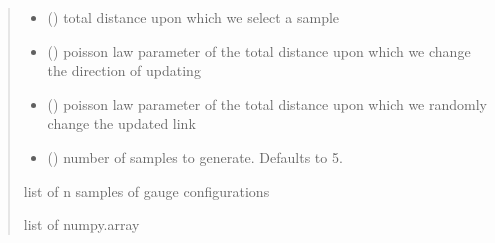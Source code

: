 \documentclass[letterpaper,10pt,english]{sphinxmanual}
\begin{document}
\begin{fulllineitems}
\begin{quote}
\begin{description}
\begin{itemize}
\item {} 
\sphinxAtStartPar
{} () \textendash{} total distance upon which we select a sample

\item {} 
\sphinxAtStartPar
{} () \textendash{} poisson law parameter of the total distance upon which we change the direction of updating

\item {} 
\sphinxAtStartPar
{} () \textendash{} poisson law parameter of the total distance upon which we randomly change the updated link

\item {} 
\sphinxAtStartPar
{} (\sphinxstyleliteralemphasis{\sphinxupquote{, }}) \textendash{} number of samples to generate. Defaults to 5.

\end{itemize}

\sphinxAtStartPar
list of n samples of gauge configurations

\sphinxAtStartPar
list of numpy.array

\end{description}\end{quote}

\end{fulllineitems}

\end{document}
